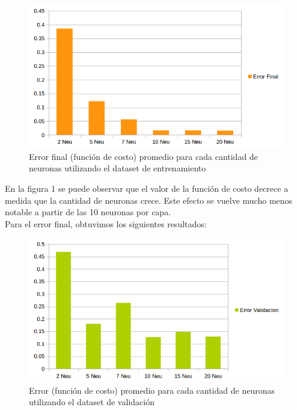 \begin{figure}[h]
  \begin{center}
  \includegraphics[scale=0.70]{graficos/fig1_cant_neuro_error_final.png}
  \caption{Error final (función de costo) promedio para cada cantidad de neuronas utilizando el dataset de entrenamiento}
  \end{center}
\end{figure}

En la figura 1 se puede observar que el valor de la función de costo decrece a medida que la cantidad
de neuronas crece. Este efecto se vuelve mucho menos notable a partir de las 10 neuronas por capa.\\

Para el error final, obtuvimos los siguientes resultados:

\begin{figure}[h]
  \begin{center}
  \includegraphics[scale=0.70]{graficos/fig2_cant_neuro_error_valid.png}
  \caption{Error (función de costo) promedio para cada cantidad de neuronas utilizando el dataset de validación}
  \end{center}
\end{figure}

